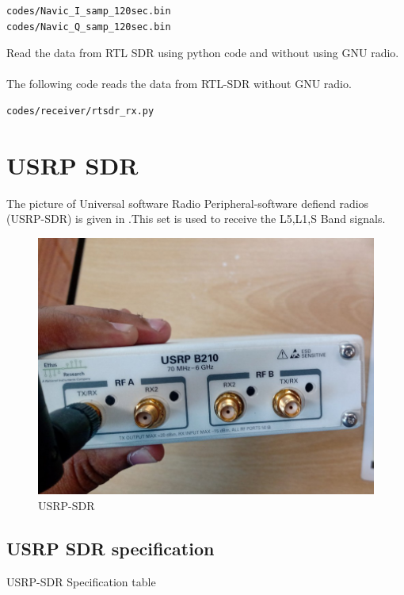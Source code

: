 \documentclass[11pt]{book}
\begin{document}
\begin{lstlisting}
codes/Navic_I_samp_120sec.bin
codes/Navic_Q_samp_120sec.bin
\end{lstlisting}

 Read the data from RTL SDR using python code and without using GNU radio.
\\
\solution \\
The following code reads the data from RTL-SDR without GNU radio.
\begin{lstlisting}
codes/receiver/rtsdr_rx.py
\end{lstlisting}














\section{USRP SDR}
The picture of Universal software Radio Peripheral-software defiend radios (USRP-SDR)  is given in .This set is used to receive the L5,L1,S Band  signals.
\begin{figure}[H]
\centering
\includegraphics[width=0.5\columnwidth]{figs/USRP.png}
\caption{USRP-SDR}
\label{fig:USRP-SDR}
\end{figure}

\subsection{ USRP SDR specification}
 \begin{table}[!ht]
  \centering
 
 \caption{USRP-SDR Specification table }
\end{table}
\end{document}
